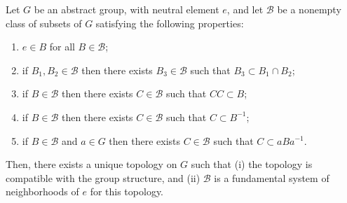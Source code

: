 Let $G$ be an abstract group, with neutral element $e$, and let $\mathcal{B}$ be a nonempty class of subsets of $G$ satisfying the following properties:
\begin{enumerate}
\item[(1)] $e \in B$ for all $B \in \mathcal{B}$;
\item[(2)] if $B_1, B_2 \in \mathcal{B}$ then there exists $B_3 \in \mathcal{B}$ such that $B_3 \subset B_1 \cap B_2$;
\item[(3)] if $B \in \mathcal{B}$ then there exists $C \in \mathcal{B}$ such that $CC \subset B$;
\item[(4)] if $B \in \mathcal{B}$ then there exists $C \in \mathcal{B}$ such that $C \subset B^{-1}$;
\item[(5)] if $B \in \mathcal{B}$ and $a \in G$ then there exists $C \in \mathcal{B}$ such that $C \subset aBa^{-1}$.
\end{enumerate}
Then, there exists a unique topology on $G$ such that (i) the topology is compatible with the group structure, and (ii) $\mathcal{B}$ is a fundamental system of neighborhoods of $e$ for this topology.
